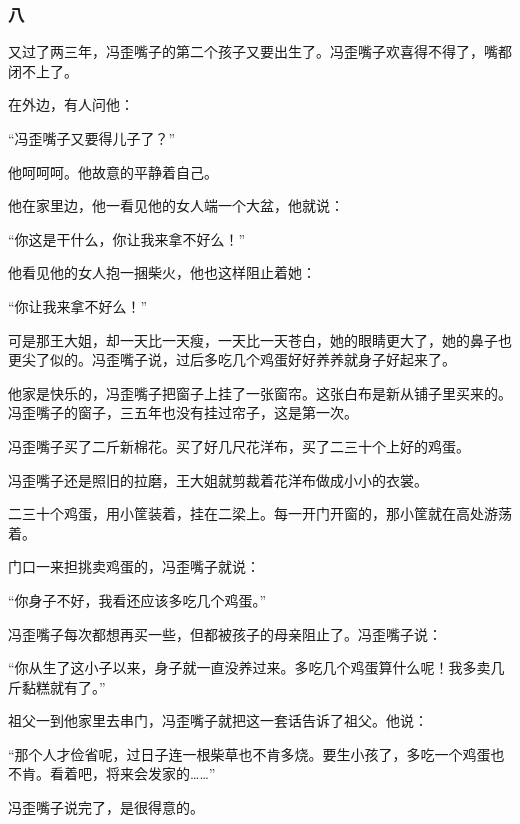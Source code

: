 \subsubsection*{八}
\par 又过了两三年，冯歪嘴子的第二个孩子又要出生了。冯歪嘴子欢喜得不得了，嘴都闭不上了。
\par 在外边，有人问他：
\par “冯歪嘴子又要得儿子了？”
\par 他呵呵呵。他故意的平静着自己。
\par 他在家里边，他一看见他的女人端一个大盆，他就说：
\par “你这是干什么，你让我来拿不好么！”
\par 他看见他的女人抱一捆柴火，他也这样阻止着她：
\par “你让我来拿不好么！”
\par 可是那王大姐，却一天比一天瘦，一天比一天苍白，她的眼睛更大了，她的鼻子也更尖了似的。冯歪嘴子说，过后多吃几个鸡蛋好好养养就身子好起来了。
\par 他家是快乐的，冯歪嘴子把窗子上挂了一张窗帘。这张白布是新从铺子里买来的。冯歪嘴子的窗子，三五年也没有挂过帘子，这是第一次。
\par 冯歪嘴子买了二斤新棉花。买了好几尺花洋布，买了二三十个上好的鸡蛋。
\par 冯歪嘴子还是照旧的拉磨，王大姐就剪裁着花洋布做成小小的衣裳。
\par 二三十个鸡蛋，用小筐装着，挂在二梁上。每一开门开窗的，那小筐就在高处游荡着。
\par 门口一来担挑卖鸡蛋的，冯歪嘴子就说：
\par “你身子不好，我看还应该多吃几个鸡蛋。”
\par 冯歪嘴子每次都想再买一些，但都被孩子的母亲阻止了。冯歪嘴子说：
\par “你从生了这小子以来，身子就一直没养过来。多吃几个鸡蛋算什么呢！我多卖几斤黏糕就有了。”
\par 祖父一到他家里去串门，冯歪嘴子就把这一套话告诉了祖父。他说：
\par “那个人才俭省呢，过日子连一根柴草也不肯多烧。要生小孩了，多吃一个鸡蛋也不肯。看着吧，将来会发家的……”
\par 冯歪嘴子说完了，是很得意的。
